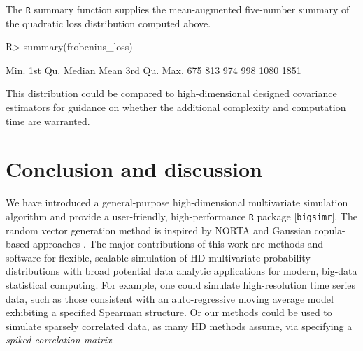 \documentclass[
]{jss}
\begin{document}
\begin{CodeChunk}
\end{CodeChunk}

The \texttt{R} summary function supplies the mean-augmented five-number
summary of the quadratic loss distribution computed above.

\begin{CodeChunk}
\begin{CodeInput}
R> summary(frobenius_loss)
\end{CodeInput}
\begin{CodeOutput}
   Min. 1st Qu.  Median    Mean 3rd Qu.    Max. 
    675     813     974     998    1080    1851 
\end{CodeOutput}
\end{CodeChunk}

This distribution could be compared to high-dimensional designed
covariance estimators for guidance on whether the additional complexity
and computation time are warranted.

\hypertarget{discussion}{%
\section{Conclusion and discussion}\label{discussion}}

We have introduced a general-purpose high-dimensional multivariate
simulation algorithm and provide a user-friendly, high-performance
\texttt{R} package {[}\texttt{bigsimr}{]}. The random vector generation
method is inspired by NORTA \citep{Cario1997} and Gaussian copula-based
approaches \citep[\citet{BF17}, \citet{Xia17}]{MB13}. The major
contributions of this work are methods and software for flexible,
scalable simulation of HD multivariate probability distributions with
broad potential data analytic applications for modern, big-data
statistical computing. For example, one could simulate high-resolution
time series data, such as those consistent with an auto-regressive
moving average model exhibiting a specified Spearman structure. Or our
methods could be used to simulate sparsely correlated data, as many HD
methods assume, via specifying a \emph{spiked correlation matrix}.
\end{document}
